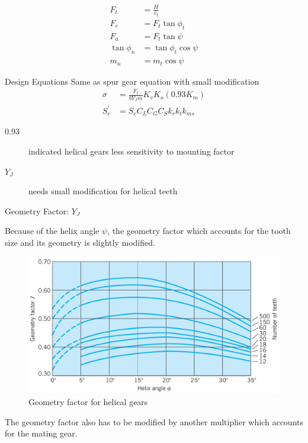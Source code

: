 \documentclass[a4paper,openany]{tufte-book}
\begin{document}
\begin{align}
  F_{t} &= \frac{H}{v_{t}} \\
  F_{r} &= F_{t} \tan \phi_{t} \\
  F_{a} &= F_{t} \tan \psi \\
  \tan \phi_{n} &= \tan \phi_{t} \cos \psi \\
  m_{n} &= m_{t} \cos \psi
\end{align}

Design Equations Same as spur gear equation with small modification
\begin{align}
    \sigma &= \frac{F_{t}}{bY_{J}m} K_{v} K_{o} (0.93 K_{m}) \\
    S_{e}^{\prime} &= S_{e}C_{L}C_{G}C_{S}k_{r}k_{t}k_{ms}
  \end{align}

\begin{description}
\item[{0.93}] indicated helical gears less sensitivity to mounting factor

\item[{\(Y_{J}\)}] needs small modification for helical teeth
\end{description}

Geometry Factor: \(Y_{J}\)

Because of the helix angle \(\psi\), the geometry factor which accounts for the tooth size and its geometry is slightly modified.

\begin{figure}[htbp]
\centering
\includegraphics[width=.9\linewidth]{./pictures/Gears/geometry-factor-helical.png}
\caption{\label{fig: geometry factor for helical gears}Geometry factor for helical gears}
\end{figure}

The geometry factor also has to be modified by another multiplier which accounts for the mating gear.
\end{document}
